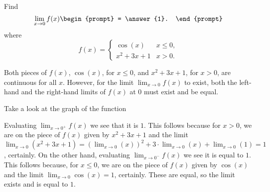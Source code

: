 \documentclass{ximera}
\author{Gregory Hartman \and Matthew Carr}
\begin{document}
\begin{exercise}



  Find 
  \[
  \lim_{x\to 0} f(x)
  \begin{prompt}
  = \answer{1}.
  \end{prompt}
  \]
  where
  \[
  f(x) = \left\{\begin{array}{cl} \cos(x) & x\leq 0, \\ x^2+3x+1 & x>0. \end{array}\right.
  \]
    \begin{hint}
     Both pieces of $f(x)$, $\cos(x)$, for $x\leq0$, and $x^2+3x+1$, for $x>0$, are continuous for all $x$. However, for the limit $\lim_{x\to0}f(x)$ to exist, both the left-hand and the right-hand limits of $f(x)$ at $0$ must exist and be equal.
    \end{hint}
     \begin{hint}
    	Take a look at the graph of the function
    \begin{center}
      \end{center} 
    \end{hint}
    \begin{hint}
     Evaluating $\lim_{x\to0^{+}}f(x)$ we see that it is $1$. This follows because for $x>0$, we are on the piece of $f(x)$ given by $x^2+3x+1$ and the limit $\lim_{x\to0}\left({x^2+3x+1}\right)=\left({\lim_{x\to0}(x)}\right)^2+3\cdot\lim_{x\to0}(x)+\lim_{x\to0}\left({1}\right)=1$, certainly. On the other hand, evaluating $\lim_{x\to0^{-}}f(x)$ we see it is equal to $1$. This follows because, for $x\leq0$, we are on the piece of $f(x)$ given by $\cos(x)$ and the limit $\lim_{x\to0}\cos(x)=1$, certainly. These are equal, so the limit exists and is equal to $1$.
    \end{hint}
\end{exercise}
\end{document}
